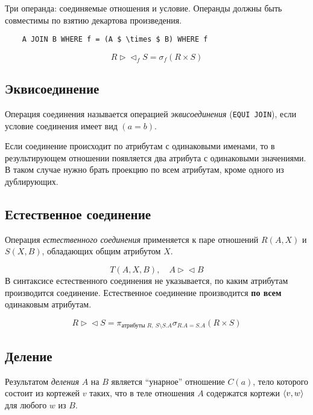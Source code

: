 Три операнда: соединяемые отношения и условие.
Операнды должны быть совместимы по взятию декартова произведения.

\begin{verbatim}
	A JOIN B WHERE f = (A $ \times $ B) WHERE f
\end{verbatim}

$$ R \vartriangleright\vartriangleleft_f S = \sigma_f (R \times S) $$

\subsection*{Эквисоединение}

\begin{definition}
	Операция соединения называется операцией \emph{эквисоединения} (\texttt{EQUI JOIN}), если условие соединения имеет вид $ (a = b) $.
\end{definition}

Если соединение происходит по атрибутам с одинаковыми именами, то в результирующем отношении появляется два атрибута с одинаковыми значениями.
В таком случае нужно брать проекцию по всем атрибутам, кроме одного из дублирующих.

\subsection*{Естественное соединение}

Операция \emph{естественного соединения} применяется к паре отношений $ R(A, X) $ и $ S(X, B) $, обладающих общим атрибутом $ X $.

$$ T(A, X, B), \quad A \vartriangleright\vartriangleleft B $$
В синтаксисе естественного соединения не указывается, по каким атрибутам производится соединение.
Естественное соединение производится \textbf{по всем} одинаковым атрибутам.

$$ R \vartriangleright\vartriangleleft S = \pi_{\text{атрибуты } R, ~ S \setminus S.A} \sigma_{R.A = S.A}(R \times S) $$

\subsection*{Деление}

\begin{definition}
	Результатом \emph{деления} $ A $ на $ B $ является ``унарное'' отношение $ C(a) $, тело которого состоит из кортежей $ v $ таких, что в теле отношения $ A $ содержатся кортежи $ \Braket{v, w} $ для любого $ w $ из $ B $.
\end{definition}

